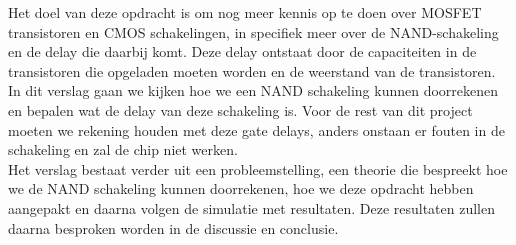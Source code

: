 \documentclass{article}
\begin{document}
Het doel van deze opdracht is om nog meer kennis op te doen over MOSFET transistoren en CMOS schakelingen, in specifiek  meer over de NAND-schakeling en de delay die daarbij komt. Deze delay ontstaat door de capaciteiten in de transistoren die opgeladen moeten worden en de weerstand van de transistoren. In dit verslag gaan we kijken hoe we een NAND schakeling kunnen doorrekenen en bepalen wat de delay van deze schakeling is. Voor de rest van dit project moeten we rekening houden met deze gate delays, anders onstaan er fouten in de schakeling en zal de chip niet werken.\\
Het verslag bestaat verder uit een probleemstelling, een theorie die bespreekt hoe we de NAND schakeling kunnen doorrekenen, hoe we deze opdracht hebben aangepakt en daarna volgen de simulatie met resultaten. Deze resultaten zullen daarna besproken worden in de discussie en conclusie.
\end{document}
